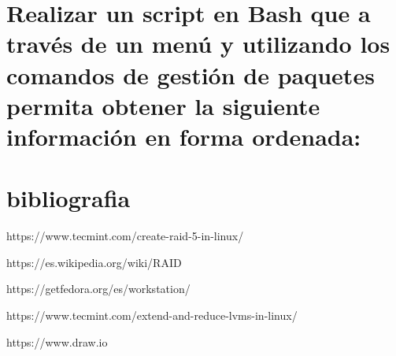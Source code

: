 \documentclass[preprint,11pt]{elsarticle}
\begin{document}
\clearpage
\section{Realizar un script en Bash que a través de un menú y utilizando los comandos de gestión de paquetes permita obtener la siguiente información en forma ordenada:}



\clearpage
\section{bibliografia}
https://www.tecmint.com/create-raid-5-in-linux/ \smallskip

https://es.wikipedia.org/wiki/RAID\smallskip

https://getfedora.org/es/workstation/\smallskip

https://www.tecmint.com/extend-and-reduce-lvms-in-linux/\smallskip

https://www.draw.io\smallskip
\end{document}
